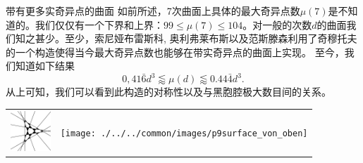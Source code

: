 ﻿\begin{surferPage}[216奇异点]{带有更多实奇异点的曲面}
如前所述，7次曲面上具体的最大奇异点数$\mu(7)$是不知道的。我们仅仅有一个下界和上界：$99\le \mu(7) \le 104$。对一般的次数$d$的曲面我们知之甚少。至少，索尼娅布雷斯科, 奥利弗莱布斯以及范斯滕森利用了奇穆托夫的一个构造使得当今最大奇异点数也能够在带实奇异点的曲面上实现。
至今，我们知道如下结果\[0,41\bar{6}d^3 \lessapprox \mu(d) \lessapprox 0.44\bar{4} d^3.\]
从上可知，我们可以看到此构造的对称性以及与黑胞腔极大数目间的关系。
 \begin{center}
      \begin{tabular}{c@{\qquad}c}
        \includegraphics[height=1.5cm]{./../../common/images/vielesing.pdf}
        &
        \texttt{[image: ./../../common/images/p9surface\_von\_oben]}
      \end{tabular}
    \end{center}
\end{surferPage}
